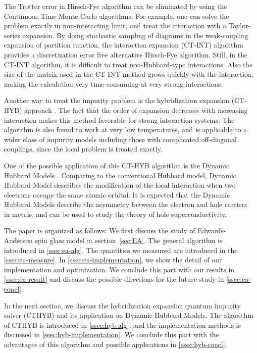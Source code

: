 The Trotter error in Hirsch-Fye algorithm can be eliminated by using the 
Continuous Time Monte Carlo algorithms. For example, one can solve the problem 
exactly in non-interacting limit, and treat the interaction with a Taylor-series
 expansion. By doing stochastic sampling of diagrams in the weak-coupling 
expansion of partition function, the interaction expansion (CT-INT) algorithm
\cite{2005PhRvB..72c5122R}
provides a discretization error free alternative Hirsch-Fye algorithm.
Still, in the CT-INT algorithm, it is difficult to treat non-Hubbard-type 
interactions. Also the size of the matrix used in the CT-INT method grows
quickly with the interaction, making the calculation very time-consuming at 
very strong interactions.

Another way to treat the impurity problem is the hybridization expansion (CT-HYB)
approach \cite{RevModPhys.83.349, PhysRevB.75.155113, PhysRevB.80.235117,
PhysRevB.74.155107}. 
The fact that the order of expansion decreases with increasing 
interaction makes this method favorable for strong interaction systems. 
The algorithm is also found to work at very low temperatures, and is applicable
to a wider class of impurity models including those with complicated 
off-diagonal couplings, since the local problem is treated exactly. 

One of the possible application of this CT-HYB algorithm is the Dynamic Hubbard
Models \cite{PhysRevLett.87.206402,2013PhyS...88c5704H}. Comparing to the conventional Hubbard model, Dynamic Hubbard Model 
describes the modification of the local interaction when two electrons 
occupy the same atomic orbital. It is expected that the Dynamic Hubbard Models
describe the asymmetry between the electron and hole carriers in metals, and can
be used to study the theory of hole superconductivity.

%


The paper is organized as follows: 
We first discuss the study of Edwards-Anderson spin glass model in 
section~\ref{sec:EA}. 
The general algorithm is introduced in \ref{ssec:ea-alg}. 
The quantities we measured are introduced in the \ref{ssec:ea-measure}. 
In \ref{ssec:ea-implementation}, we show the detail of our implementation and 
optimization.  We conclude this part with our results in \ref{ssec:ea-result} 
and discuss the possible directions for the future study in \ref{ssec:ea-concl}.

In the next section, we discuss the hybridization expansion quantum impurity 
solver (CTHYB) and its application on Dynamic Hubbard Models. 
The algorithm of CTHYB is introduced in \ref{ssec:hyb-alg}, 
and the implementation methods is discussed in \ref{ssec:hyb-implementation}. 
We conclude this part with the advantages of this algorithm and possible 
applications in \ref{ssec:hyb-concl}.

\fi

